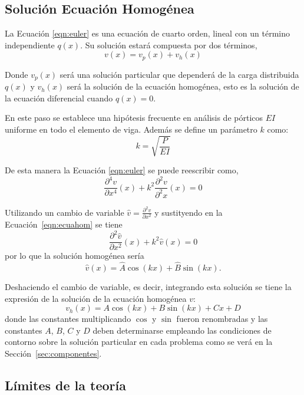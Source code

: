 \subsection{Solución Ecuación Homogénea}

La Ecuación \eqref{eqn:euler} es una ecuación de cuarto orden, lineal con un término independiente $q(x)$. Su solución estará compuesta por dos términos,
\begin{equation}
v(x)= v_p(x) + v_h(x)
\end{equation}

Donde $v_p(x)$ será una solución particular que dependerá de la carga distribuida $q(x)$ y $v_h(x)$ será la solución de la ecuación homogénea, esto es la solución de la ecuación diferencial cuando $q(x)=0$.

En este paso se establece una hipótesis frecuente en análisis de pórticos $EI$ uniforme en todo el elemento de viga. %
%
Además se define un parámetro $k$ como:
%
\begin{equation}\label{eqn:defk}
k = \sqrt{\frac{P}{EI}}
\end{equation}

De esta manera la Ecuación \eqref{eqn:euler} se puede reescribir como,
\begin{equation}\label{eqn:ecuahom}
\boxed{
\frac{\partial^4 v}{\partial x^4}(x) + k^2 \frac{\partial^2 v}{\partial^2 x}(x) = 0
}
\end{equation}

Utilizando un cambio de variable $\hat{v}=\frac{\partial^2 v}{\partial x^2}$ y sustityendo en la Ecuación~\eqref{eqn:ecuahom} se tiene
$$
\frac{\partial^2 \hat{v}}{\partial x^2}(x) + k^2 \hat{v}(x) = 0
$$
por lo que la solución homogénea sería
$$
\hat{v}(x) = \hat{A} \cos (kx) + \hat{B} \sin (kx).
$$

Deshaciendo el cambio de variable, es decir, integrando esta solución se tiene la expresión de la solución de la ecuación homogénea $v$:
%
\begin{equation}
v_h(x) = A \cos (kx) + B \sin (kx) + Cx + D
\end{equation}
%
donde las constantes multiplicando $\cos$ y $\sin$ fueron renombradas y las constantes $A$, $B$, $C$ y $D$ deben determinarse empleando las condiciones de contorno sobre la solución particular en cada problema como se verá en la Sección~\ref{sec:componentes}.


\subsection{Límites de la teoría}

